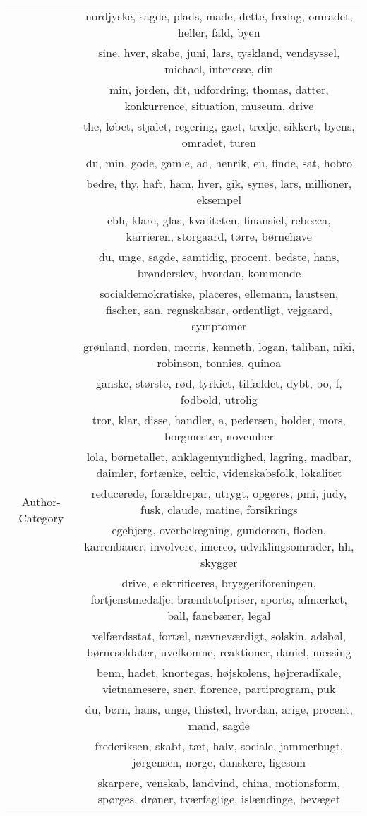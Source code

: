\begin{table}
\begin{tabular}{c|c}
		& nordjyske, sagde, plads, made, dette, fredag, omradet, heller, fald, byen \\
		& sine, hver, skabe, juni, lars, tyskland, vendsyssel, michael, interesse, din \\
		& min, jorden, dit, udfordring, thomas, datter, konkurrence, situation, museum, drive \\
		& the, løbet, stjalet, regering, gaet, tredje, sikkert, byens, omradet, turen \\
		& du, min, gode, gamle, ad, henrik, eu, finde, sat, hobro \\
		& bedre, thy, haft, ham, hver, gik, synes, lars, millioner, eksempel \\
		\midrule
		\multirow{15}{*}{Author-Category} & ebh, klare, glas, kvaliteten, finansiel, rebecca, karrieren, storgaard, tørre, børnehave \\
		& du, unge, sagde, samtidig, procent, bedste, hans, brønderslev, hvordan, kommende \\
		& socialdemokratiske, placeres, ellemann, laustsen, fischer, san, regnskabsar, ordentligt, vejgaard, symptomer \\
		& grønland, norden, morris, kenneth, logan, taliban, niki, robinson, tonnies, quinoa \\
		& ganske, største, rød, tyrkiet, tilfældet, dybt, bo, f, fodbold, utrolig \\
		& tror, klar, disse, handler, a, pedersen, holder, mors, borgmester, november \\
		& lola, børnetallet, anklagemyndighed, lagring, madbar, daimler, fortænke, celtic, videnskabsfolk, lokalitet \\
		& reducerede, forældrepar, utrygt, opgøres, pmi, judy, fusk, claude, matine, forsikrings \\
		& egebjerg, overbelægning, gundersen, floden, karrenbauer, involvere, imerco, udviklingsomrader, hh, skygger \\
		& drive, elektrificeres, bryggeriforeningen, fortjenstmedalje, brændstofpriser, sports, afmærket, ball, fanebærer, legal \\
		& velfærdsstat, fortæl, nævneværdigt, solskin, adsbøl, børnesoldater, uvelkomne, reaktioner, daniel, messing \\
		& benn, hadet, knortegas, højskolens, højreradikale, vietnamesere, sner, florence, partiprogram, puk \\
		& du, børn, hans, unge, thisted, hvordan, arige, procent, mand, sagde \\
		& frederiksen, skabt, tæt, halv, sociale, jammerbugt, jørgensen, norge, danskere, ligesom \\
		& skarpere, venskab, landvind, china, motionsform, spørges, drøner, tværfaglige, islændinge, bevæget \\
	\end{tabular}
\end{table}
